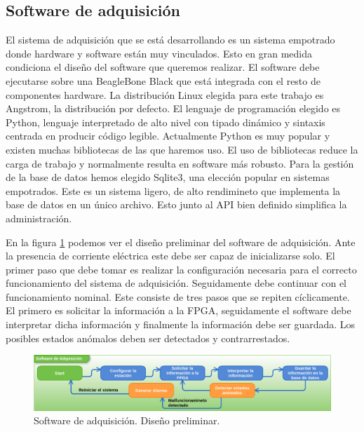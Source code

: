 	\subsection{Software de adquisición}
		El sistema de adquisición que se está desarrollando es un sistema empotrado donde hardware y software están muy vinculados. Esto en
		gran medida condiciona el diseño del software que queremos realizar. El software debe ejecutarse sobre una BeagleBone
		Black\cite{Beagle} que está integrada con el resto de componentes hardware. La distribución Linux elegida para este trabajo es
		Angstrom, la distribución por defecto. El lenguaje de programación elegido es Python\cite{Python}, lenguaje interpretado de alto nivel
		con tipado dinámico y sintaxis centrada en producir código legible.  Actualmente Python es muy popular y existen muchas bibliotecas de
		las que haremos uso. El uso de bibliotecas reduce la carga de trabajo y normalmente resulta en software más robusto. Para la gestión
		de la base de datos hemos elegido Sqlite3\cite{Sqlite}, una elección popular en sistemas empotrados. Este es un sistema ligero, de
		alto rendimineto que implementa la base de datos en un único archivo. Esto junto al API bien definido simplifica la administración.
		\par
		En la figura \ref{fig:soft_control_preliminar} podemos ver el diseño preliminar del software de adquisición. Ante la presencia de
		corriente eléctrica este debe ser capaz de inicializarse solo. El primer paso que debe tomar es realizar la configuración necesaria
		para el correcto funcionamiento del sistema de adquisición. Seguidamente debe continuar con el funcionamiento nominal. Este consiste
		de tres pasos que se repiten cíclicamente. El primero es solicitar la información a la FPGA, seguidamente el software debe interpretar
		dicha información y finalmente la información debe ser guardada. Los posibles estados anómalos deben ser detectados y contrarrestados. 
		\begin{figure}[h]
			\centering
			\includegraphics[keepaspectratio, width=1\textwidth]{./img/soft_control_preliminar.png}
			\caption{Software de adquisición. Diseño preliminar.}
			\label{fig:soft_control_preliminar}
		\end{figure}
